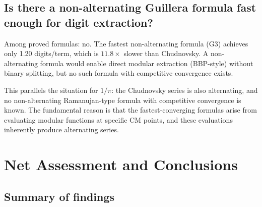 \documentclass[11pt]{article}
\begin{document}
\subsection{Is there a non-alternating Guillera formula fast enough for digit extraction?}

Among proved formulas: no. The fastest non-alternating formula (G3) achieves only 1.20 digits/term, which is $11.8\times$ slower than Chudnovsky. A non-alternating formula would enable direct modular extraction (BBP-style) without binary splitting, but no such formula with competitive convergence exists.

This parallels the situation for $1/\pi$: the Chudnovsky series is also alternating, and no non-alternating Ramanujan-type formula with competitive convergence is known. The fundamental reason is that the fastest-converging formulas arise from evaluating modular functions at specific CM points, and these evaluations inherently produce alternating series.

\section{Net Assessment and Conclusions}
\label{sec:conclusion}

\subsection{Summary of findings}
\end{document}
